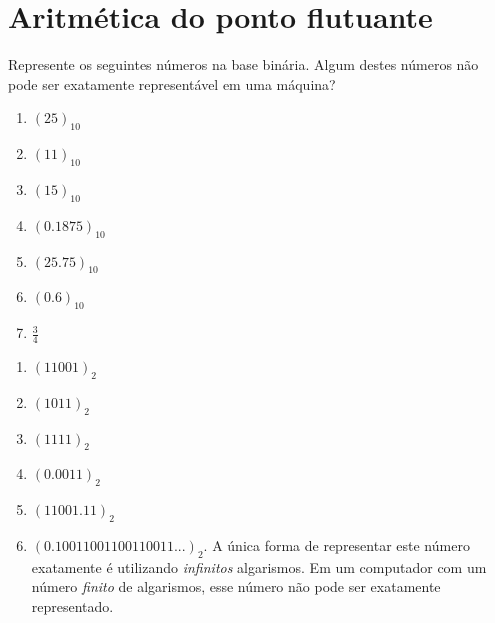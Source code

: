%
\section{Aritmética do ponto flutuante}


\begin{ex}
Represente os seguintes números na base binária. Algum destes números não pode ser exatamente representável em uma máquina? 
\begin{multicols}{2}
\begin{enumerate}[label=\alph*)]
\item $(25)_{10}$
\item $(11)_{10}$
\item $(15)_{10}$
\item $(0.1875)_{10}$
\item $(25.75)_{10}$
\item $(0.6)_{10}$
\item $\frac{3}{4}$
\end{enumerate}
\end{multicols}
\begin{sol}
\begin{enumerate}[label=\alph*)]
\item $(11001)_2$
\item $(1011)_2$
\item $(1111)_2$
\item $(0.0011)_2$
\item $(11001.11)_2$
\item $(0.10011001100110011...)_2.$ A única forma de representar este número exatamente é utilizando \emph{infinitos} algarismos. Em um computador com um número \emph{finito} de algarismos, esse número não pode ser exatamente representado.
\end{enumerate}
\end{sol}
\end{ex}


